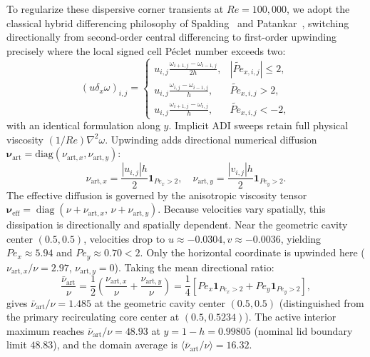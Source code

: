 \documentclass[11pt,a4paper]{article}
\begin{document}
To regularize these dispersive corner transients at $Re = 100{,}000$, we adopt the classical hybrid differencing philosophy of Spalding~\cite{spalding1972novel} and Patankar~\cite{patankar1980numerical}, switching directionally from second-order central differencing to first-order upwinding precisely where the local signed cell P\'eclet number exceeds two:
\begin{equation}
    (u \delta_x \omega)_{i, j} = \begin{cases}
        u_{i, j} \frac{\omega_{i+1, j} - \omega_{i-1, j}}{2 h}, & |\widetilde{Pe}_{x, i, j}| \le 2, \\
        u_{i, j} \frac{\omega_{i, j} - \omega_{i-1, j}}{h}, & \widetilde{Pe}_{x, i, j} > 2, \\
        u_{i, j} \frac{\omega_{i+1, j} - \omega_{i, j}}{h}, & \widetilde{Pe}_{x, i, j} < -2,
    \end{cases}
\end{equation}
with an identical formulation along $y$. Implicit ADI sweeps retain full physical viscosity $(1/Re)\nabla^2 \omega$. Upwinding adds directional numerical diffusion $\boldsymbol{\nu}_{\text{art}} = \text{diag}(\nu_{\text{art}, x}, \nu_{\text{art}, y})$:
\begin{equation}
    \nu_{\text{art}, x} = \frac{|u_{i, j}| h}{2} \mathbf{1}_{Pe_x > 2}, \quad \nu_{\text{art}, y} = \frac{|v_{i, j}| h}{2} \mathbf{1}_{Pe_y > 2}.
\end{equation}
The effective diffusion is governed by the anisotropic viscosity tensor $\boldsymbol{\nu}_{\text{eff}} = \operatorname{diag}(\nu + \nu_{\text{art}, x}, \, \nu + \nu_{\text{art}, y})$. Because velocities vary spatially, this dissipation is directionally and spatially dependent. Near the geometric cavity center $(0.5, 0.5)$, velocities drop to $u \approx -0.0304, v \approx -0.0036$, yielding $Pe_x \approx 5.94$ and $Pe_y \approx 0.70 < 2$. Only the horizontal coordinate is upwinded here ($\nu_{\text{art}, x} / \nu = 2.97$, $\nu_{\text{art}, y} = 0$). Taking the mean directional ratio:
\begin{equation}
    \frac{\bar{\nu}_{\text{art}}}{\nu} = \frac{1}{2}\left( \frac{\nu_{\text{art}, x}}{\nu} + \frac{\nu_{\text{art}, y}}{\nu} \right) = \frac{1}{4} \left[ Pe_x \mathbf{1}_{Pe_x > 2} + Pe_y \mathbf{1}_{Pe_y > 2} \right], \label{eq:excess_visc}
\end{equation}
gives $\bar{\nu}_{\text{art}} / \nu = 1.485$ at the geometric cavity center $(0.5, 0.5)$ (distinguished from the primary recirculating core center at $(0.5, 0.5234)$). The active interior maximum reaches $\bar{\nu}_{\text{art}} / \nu = 48.93$ at $y = 1-h = 0.99805$ (nominal lid boundary limit $48.83$), and the domain average is $\langle \bar{\nu}_{\text{art}} / \nu \rangle = 16.32$.
\end{document}
